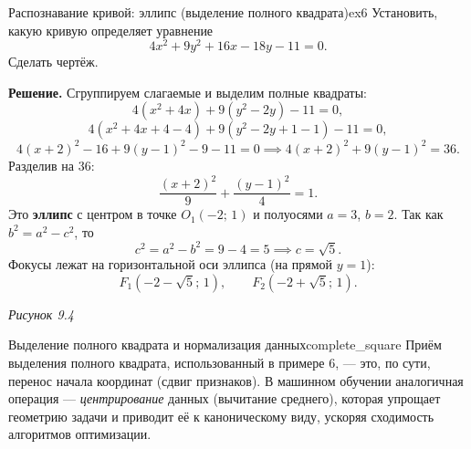 \documentclass[12pt,a4paper]{article}
\begin{document}
\begin{exampleBox}{Распознавание кривой: эллипс (выделение
  полного квадрата)}{ex6}
  Установить, какую кривую определяет уравнение
  \[
    4x^2 + 9y^2 + 16x - 18y - 11 = 0.
  \]
  Сделать чертёж.

  \textbf{Решение.} Сгруппируем слагаемые и выделим полные квадраты:
  \[
    4(x^2 + 4x) + 9(y^2 - 2y) - 11 = 0,
  \]
  \[
    4(x^2 + 4x + 4 - 4) + 9(y^2 - 2y + 1 - 1) - 11 = 0,
  \]
  \[
    4(x + 2)^2 - 16 + 9(y - 1)^2 - 9 - 11 = 0
    \implies 4(x + 2)^2 + 9(y - 1)^2 = 36.
  \]
  Разделив на $36$:
  \[
    \frac{(x + 2)^2}{9} + \frac{(y - 1)^2}{4} = 1.
  \]
  Это \textbf{эллипс} с центром в точке $O_1(-2;\, 1)$ и полуосями
  $a = 3$, $b = 2$. Так как $b^2 = a^2 - c^2$, то
  \[
    c^2 = a^2 - b^2 = 9 - 4 = 5 \implies c = \sqrt{5}.
  \]
  Фокусы лежат на горизонтальной оси эллипса (на прямой $y = 1$):
  \[
    F_1(-2 - \sqrt{5};\, 1), \qquad F_2(-2 + \sqrt{5};\, 1).
  \]

  \begin{center}

    \textit{Рисунок 9.4}
  \end{center}
\end{exampleBox}

\begin{remarkIT}{Выделение полного квадрата и нормализация
  данных}{complete_square}
  Приём выделения полного квадрата, использованный в примере 6, —
  это, по сути, перенос начала координат (сдвиг признаков). В машинном
  обучении аналогичная операция — \emph{центрирование} данных (вычитание
  среднего), которая упрощает геометрию задачи и приводит её к
  каноническому виду, ускоряя сходимость алгоритмов оптимизации.
\end{remarkIT}
\end{document}
